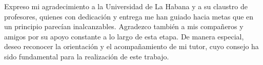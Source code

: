 \begin{acknowledgements}
    Expreso mi agradecimiento a la Universidad de La Habana y a su claustro de profesores, quienes con dedicación y entrega me han guiado hacia metas que en un principio parecían inalcanzables. Agradezco también a mis compañeros y amigos por su apoyo constante a lo largo de esta etapa. De manera especial, deseo reconocer la orientación y el acompañamiento de mi tutor, cuyo consejo ha sido fundamental para la realización de este trabajo.
\end{acknowledgements}
